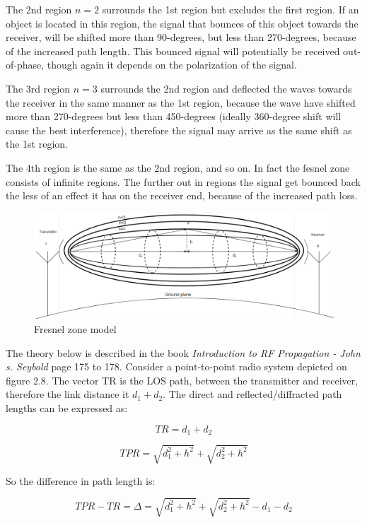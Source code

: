 The 2nd region $n=2$ surrounds the 1st region but excludes the first region. If an object is located in this region, the signal that bounces of this object towards the receiver, will be shifted more than 90-degrees, but less than 270-degrees, because of the increased path length. This bounced signal will potentially be received out-of-phase, though again it depends on the polarization of the signal.

The 3rd region $n=3$ surrounds the 2nd region and deflected the waves towards the receiver in the same manner as the 1st region, because the wave have shifted more than 270-degrees but less than 450-degrees (ideally 360-degree shift will cause the best interference), therefore the signal may arrive as the same shift as the 1st region. 

The 4th region is the same as the 2nd region, and so on. In fact the fesnel zone consists of infinite regions. The further out in regions the signal get bounced back the less of an effect it has on the receiver end, because of the increased path loss.\cite{FesnelZone}  

\begin{figure}[h]
\hspace{-3cm}
\includegraphics[scale=0.6]{figures/FresnelZoneN.PNG}
\caption{Fresnel zone model}
\end{figure}
The theory below is described in the book \textit{Introduction to RF Propagation - John s. Seybold}\cite{RFpropagation} page 175 to 178.
Consider a point-to-point radio system depicted on figure 2.8. The vector TR is the LOS path, between the transmitter and receiver, therefore the link distance it $d_1 + d_2$. The direct and reflected/diffracted path lengths can be expressed as: 

$$TR=d_1 + d_2$$

$$TPR=\sqrt{d_1^2+h^2}+\sqrt{d_2^2+h^2}$$

So the difference in path length is:

\begin{equation}
  TPR-TR = \Delta = \sqrt{d_1^2+h^2}+\sqrt{d_2^2+h^2}-d_1-d_2
\end{equation}

